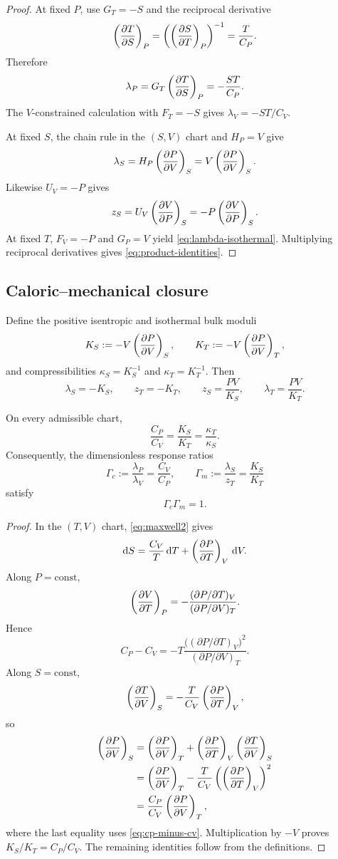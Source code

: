 \begin{proof}
At fixed $P$, use $G_T=-S$ and the reciprocal derivative
\[
\left(\frac{\partial T}{\partial S}\right)_{P}=\left(\left(\frac{\partial S}{\partial T}\right)_{P}\right)^{-1}=\frac{T}{C_P}.
\]
Therefore
\[
\lambda_P=G_T\left(\frac{\partial T}{\partial S}\right)_{P}=-\frac{ST}{C_P}.
\]
The $V$-constrained calculation with $F_T=-S$ gives $\lambda_V=-ST/C_V$.

At fixed $S$, the chain rule in the $(S,V)$ chart and $H_P=V$ give
\[
\lambda_S=H_P\left(\frac{\partial P}{\partial V}\right)_{S}=V\left(\frac{\partial P}{\partial V}\right)_{S}.
\]
Likewise $U_V=-P$ gives
\[
z_S=U_V\left(\frac{\partial V}{\partial P}\right)_{S}=-P\left(\frac{\partial V}{\partial P}\right)_{S}.
\]
At fixed $T$, $F_V=-P$ and $G_P=V$ yield \eqref{eq:lambda-isothermal}.  Multiplying reciprocal derivatives gives \eqref{eq:product-identities}.
\end{proof}

\subsection{Caloric--mechanical closure}

Define the positive isentropic and isothermal bulk moduli
\[
K_S:=-V\left(\frac{\partial P}{\partial V}\right)_{S},
\qquad
K_T:=-V\left(\frac{\partial P}{\partial V}\right)_{T},
\]
and compressibilities $\kappa_S=K_S^{-1}$ and $\kappa_T=K_T^{-1}$.
Then
\[
\lambda_S=-K_S,
\qquad
z_T=-K_T,
\qquad
z_S=\frac{PV}{K_S},
\qquad
\lambda_T=\frac{PV}{K_T}.
\]

\begin{theorem}
On every admissible chart,
\begin{equation}
\frac{C_P}{C_V}
=\frac{K_S}{K_T}
=\frac{\kappa_T}{\kappa_S}.
\label{eq:cp-cv-kappa}
\end{equation}
Consequently, the dimensionless response ratios
\[
\Gamma_c:=\frac{\lambda_P}{\lambda_V}=\frac{C_V}{C_P},
\qquad
\Gamma_m:=\frac{\lambda_S}{z_T}=\frac{K_S}{K_T}
\]
satisfy
\begin{equation}
\boxed{\Gamma_c\Gamma_m=1.}
\label{eq:equilibrium-invariant}
\end{equation}
\end{theorem}

\begin{proof}
In the $(T,V)$ chart, \eqref{eq:maxwell2} gives
\[
\mathrm d S=\frac{C_V}{T}\,\mathrm d T+\left(\frac{\partial P}{\partial T}\right)_{V}\,\mathrm d V.
\]
Along $P=\mathrm{const}$,
\[
\left(\frac{\partial V}{\partial T}\right)_{P}
=-\frac{(\partial P/\partial T)_V}{(\partial P/\partial V)_T}.
\]
Hence
\begin{equation}
C_P-C_V
=-T\frac{\bigl((\partial P/\partial T)_V\bigr)^2}
{(\partial P/\partial V)_T}.
\label{eq:cp-minus-cv}
\end{equation}
Along $S=\mathrm{const}$,
\[
\left(\frac{\partial T}{\partial V}\right)_{S}
=-\frac{T}{C_V}\left(\frac{\partial P}{\partial T}\right)_{V},
\]
so
\begin{align*}
\left(\frac{\partial P}{\partial V}\right)_{S}
&=\left(\frac{\partial P}{\partial V}\right)_{T}
+\left(\frac{\partial P}{\partial T}\right)_{V}\left(\frac{\partial T}{\partial V}\right)_{S}\\
&=\left(\frac{\partial P}{\partial V}\right)_{T}
-\frac{T}{C_V}\left(\left(\frac{\partial P}{\partial T}\right)_{V}\right)^2\\
&=\frac{C_P}{C_V}\left(\frac{\partial P}{\partial V}\right)_{T},
\end{align*}
where the last equality uses \eqref{eq:cp-minus-cv}.  Multiplication by $-V$ proves $K_S/K_T=C_P/C_V$.  The remaining identities follow from the definitions.
\end{proof}

